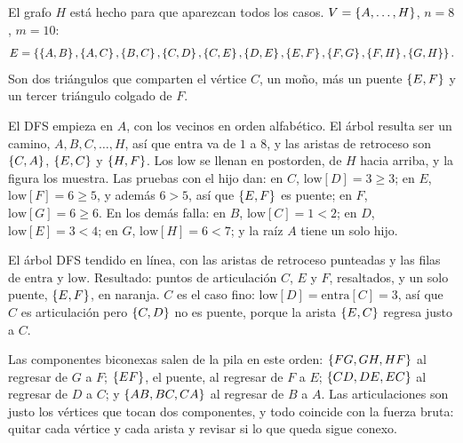 \documentclass[11pt,letterpaper]{article}
\begin{document}
\begin{ejemplo}
  \label{ej:articulaciones-mono}
  El grafo $H$ está hecho para que aparezcan todos los casos.
  $V = \left\{ A, \dots, H \right\}$, $n = 8$, $m = 10$:
  \[
    E = \left\{ \left\{ A,B \right\}, \left\{ A,C \right\}, \left\{ B,C \right\}, \left\{ C,D \right\}, \left\{ C,E \right\},
             \left\{ D,E \right\}, \left\{ E,F \right\}, \left\{ F,G \right\}, \left\{ F,H \right\}, \left\{ G,H \right\} \right\} .
  \]
  Son dos triángulos que comparten el vértice $C$, un moño, más un
  puente $\left\{ E, F \right\}$ y un tercer triángulo colgado de $F$.

  El DFS empieza en $A$, con los vecinos en orden alfabético. El árbol
  resulta ser un camino, $A, B, C, \dots, H$, así que $\text{entra}$ va
  de $1$ a $8$, y las aristas de retroceso son $\left\{ C, A \right\}$,
  $\left\{ E, C \right\}$ y $\left\{ H, F \right\}$. Los $\text{low}$ se llenan en
  postorden, de $H$ hacia arriba, y la figura los muestra. Las pruebas
  con el hijo dan: en $C$, $\text{low}[D] = 3 \ge 3$; en $E$,
  $\text{low}[F] = 6 \ge 5$, y además $6 > 5$, así que $\left\{ E, F \right\}$ es
  puente; en $F$, $\text{low}[G] = 6 \ge 6$. En los demás falla: en
  $B$, $\text{low}[C] = 1 < 2$; en $D$, $\text{low}[E] = 3 < 4$; en
  $G$, $\text{low}[H] = 6 < 7$; y la raíz $A$ tiene un solo hijo.
  \begin{center}
  \end{center}
  El árbol DFS tendido en línea, con las aristas de retroceso punteadas
  y las filas de $\text{entra}$ y $\text{low}$. Resultado: puntos de
  articulación $C$, $E$ y $F$, resaltados, y un solo puente,
  $\left\{ E, F \right\}$, en naranja. $C$ es el caso fino:
  $\text{low}[D] = \text{entra}[C] = 3$, así que $C$ es articulación
  pero $\left\{ C, D \right\}$ no es puente, porque la arista $\left\{ E, C \right\}$ regresa
  justo a $C$.

  Las componentes biconexas salen de la pila en este orden:
  $\left\{ FG, GH, HF \right\}$ al regresar de $G$ a $F$; $\left\{ EF \right\}$, el puente,
  al regresar de $F$ a $E$; $\left\{ CD, DE, EC \right\}$ al regresar de $D$ a
  $C$; y $\left\{ AB, BC, CA \right\}$ al regresar de $B$ a $A$.
  Las articulaciones son justo los vértices que tocan dos componentes,
  y todo coincide con la fuerza bruta: quitar cada vértice y cada
  arista y revisar si lo que queda sigue conexo.
\end{ejemplo}
\end{document}
